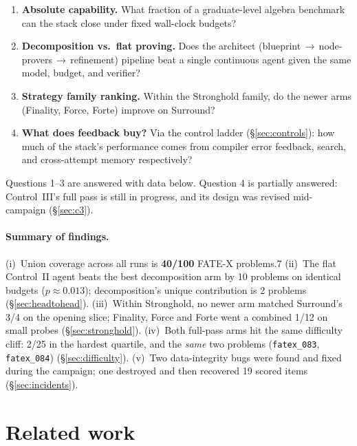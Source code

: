 \documentclass[12pt, a4paper]{article}
\newcommand{\run}[1]{\texttt{#1}}
\begin{document}
\begin{enumerate}[itemsep=1pt]
  \item \textbf{Absolute capability.} What fraction of a graduate-level algebra
        benchmark can the stack close under fixed wall-clock budgets?
  \item \textbf{Decomposition vs.\ flat proving.} Does the architect
        (blueprint\,$\to$\,node-provers\,$\to$\,refinement) pipeline beat a
        single continuous agent given the same model, budget, and verifier?
  \item \textbf{Strategy family ranking.} Within the Stronghold family, do the
        newer arms (Finality, Force, Forte) improve on Surround?
  \item \textbf{What does feedback buy?} Via the control ladder
        (\S\ref{sec:controls}): how much of the stack's performance comes from
        compiler error feedback, search, and cross-attempt memory respectively?
\end{enumerate}

Questions 1--3 are answered with data below. Question 4 is partially answered:
Control~III's full pass is still in progress, and its design was revised
mid-campaign (\S\ref{sec:c3}).

\paragraph{Summary of findings.}
(i)~Union coverage across all runs is \textbf{40/100} FATE-X problems.7
(ii)~The flat Control~II agent beats the best decomposition arm by 10 problems
on identical budgets ($p\approx0.013$); decomposition's unique contribution is
2 problems (\S\ref{sec:headtohead}).
(iii)~Within Stronghold, no newer arm matched Surround's 3/4 on the opening
slice; Finality, Force and Forte went a combined 1/12 on small probes
(\S\ref{sec:stronghold}).
(iv)~Both full-pass arms hit the same difficulty cliff: 2/25 in the hardest
quartile, and the \emph{same} two problems (\run{fatex\_083},
\run{fatex\_084}) (\S\ref{sec:difficulty}).
(v)~Two data-integrity bugs were found and fixed during the campaign; one
destroyed and then recovered 19 scored items (\S\ref{sec:incidents}).

\section{Related work}
\end{document}
